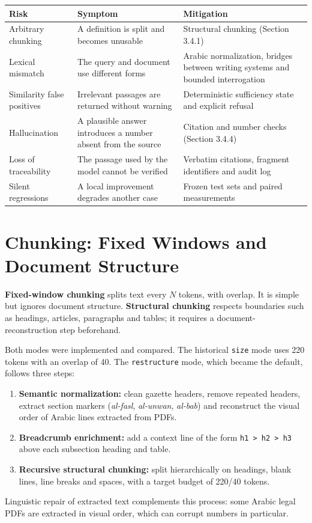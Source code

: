 \documentclass[a4paper,12pt,openany]{report}
\begin{document}
\begin{table}[htbp]
\centering
\small
\begin{tabular}{p{3.5cm}p{5.0cm}p{5.7cm}}
\toprule
\textbf{Risk} & \textbf{Symptom} & \textbf{Mitigation} \\
\midrule
Arbitrary chunking & A definition is split and becomes unusable & Structural chunking (Section 3.4.1) \\
Lexical mismatch & The query and document use different forms & Arabic normalization, bridges
between writing systems and bounded interrogation \\
Similarity false positives & Irrelevant passages are returned without warning & Deterministic
sufficiency state and explicit refusal \\
Hallucination & A plausible answer introduces a number absent from the source & Citation and
number checks (Section 3.4.4) \\
Loss of traceability & The passage used by the model cannot be verified & Verbatim citations,
fragment identifiers and audit log \\
Silent regressions & A local improvement degrades another case & Frozen test sets and paired
measurements \\
\bottomrule
\end{tabular}
\end{table}

\section{Chunking: Fixed Windows and Document Structure}
\textbf{Fixed-window chunking} splits text every $N$ tokens, with overlap. It is simple but ignores
document structure. \textbf{Structural chunking} respects boundaries such as headings, articles,
paragraphs and tables; it requires a document-reconstruction step beforehand.

Both modes were implemented and compared. The historical \texttt{size} mode uses 220 tokens with
an overlap of 40. The \texttt{restructure} mode, which became the default, follows three steps:
\begin{enumerate}
  \item \textbf{Semantic normalization:} clean gazette headers, remove repeated headers, extract
section markers (\emph{al-fasl}, \emph{al-unwan}, \emph{al-bab}) and reconstruct the visual order
of Arabic lines extracted from PDFs.
  \item \textbf{Breadcrumb enrichment:} add a context line of the form \texttt{h1 > h2 > h3} above
each subsection heading and table.
  \item \textbf{Recursive structural chunking:} split hierarchically on headings, blank lines, line
breaks and spaces, with a target budget of 220/40 tokens.
\end{enumerate}
Linguistic repair of extracted text complements this process: some Arabic legal PDFs are extracted
in visual order, which can corrupt numbers in particular.
\end{document}
